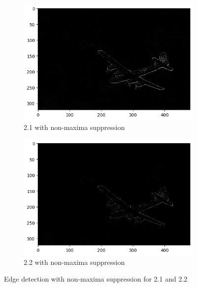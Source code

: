 \documentclass[12pt]{article}
\begin{document}
\begin{figure}[H]
    \centering
    \begin{subfigure}{0.45\textwidth} %
        \centering
        \includegraphics[width=\textwidth]{images/2_1_with_non_maxima.png}
        \caption{2.1 with non-maxima suppression}
        \label{fig:sub1}
    \end{subfigure}
    \hfill %
    \begin{subfigure}{0.45\textwidth} %
        \centering
        \includegraphics[width=\textwidth]{images/2_2_with_non_maxima.png}
        \caption{2.2 with non-maxima suppression}
        \label{fig:sub2}
    \end{subfigure}
    \caption{Edge detection with non-maxima suppression for 2.1 and 2.2}
    \label{fig:main}
\end{figure}
\end{document}
